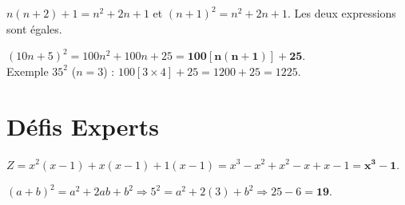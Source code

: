 \documentclass[a4paper]{book}
\begin{document}
    \begin{exercice}
        $n(n+2)+1 = n^2+2n+1$ et $(n+1)^2 = n^2+2n+1$. Les deux expressions sont égales.
    \end{exercice}
    
    \begin{exercice}
        $(10n+5)^2 = 100n^2 + 100n + 25 = \mathbf{100[n(n+1)] + 25}$. \\
        Exemple $35^2$ ($n=3$) : $100[3 \times 4] + 25 = 1200 + 25 = 1225$.
    \end{exercice}
    
\section{Défis Experts}
    
    \begin{exercice}
        $Z = x^2(x-1) + x(x-1) + 1(x-1) = x^3 - x^2 + x^2 - x + x - 1 = \mathbf{x^3 - 1}$.
    \end{exercice}
    
    \begin{exercice}
        $(a+b)^2 = a^2 + 2ab + b^2 \Longrightarrow 5^2 = a^2 + 2(3) + b^2 \Longrightarrow 25 - 6 = \mathbf{19}$.
    \end{exercice}
\end{document}
